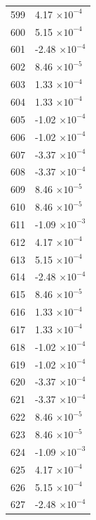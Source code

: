 \documentclass[a4paper,11pt]{article}
\begin{document}
\begin{center}
\begin{longtable}{|R{1.5cm}|R{2.5cm}|}
  599 &         4.17 $\times 10^{          -4}$ \\
  600 &         5.15 $\times 10^{          -4}$ \\
  601 &        -2.48 $\times 10^{          -4}$ \\
  602 &         8.46 $\times 10^{          -5}$ \\
  603 &         1.33 $\times 10^{          -4}$ \\
  604 &         1.33 $\times 10^{          -4}$ \\
  605 &        -1.02 $\times 10^{          -4}$ \\
  606 &        -1.02 $\times 10^{          -4}$ \\
  607 &        -3.37 $\times 10^{          -4}$ \\
  608 &        -3.37 $\times 10^{          -4}$ \\
  609 &         8.46 $\times 10^{          -5}$ \\
  610 &         8.46 $\times 10^{          -5}$ \\
  611 &        -1.09 $\times 10^{          -3}$ \\
  612 &         4.17 $\times 10^{          -4}$ \\
  613 &         5.15 $\times 10^{          -4}$ \\
  614 &        -2.48 $\times 10^{          -4}$ \\
  615 &         8.46 $\times 10^{          -5}$ \\
  616 &         1.33 $\times 10^{          -4}$ \\
  617 &         1.33 $\times 10^{          -4}$ \\
  618 &        -1.02 $\times 10^{          -4}$ \\
  619 &        -1.02 $\times 10^{          -4}$ \\
  620 &        -3.37 $\times 10^{          -4}$ \\
  621 &        -3.37 $\times 10^{          -4}$ \\
  622 &         8.46 $\times 10^{          -5}$ \\
  623 &         8.46 $\times 10^{          -5}$ \\
  624 &        -1.09 $\times 10^{          -3}$ \\
  625 &         4.17 $\times 10^{          -4}$ \\
  626 &         5.15 $\times 10^{          -4}$ \\
  627 &        -2.48 $\times 10^{          -4}$ \\

\end{longtable}
\end{center}
\end{document}
